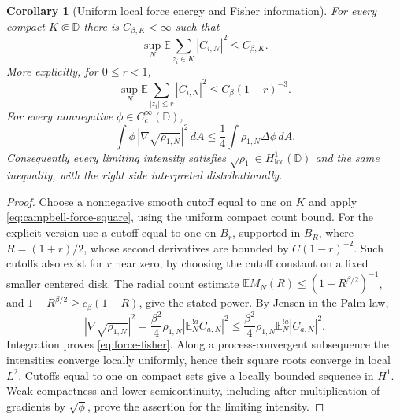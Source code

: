 \documentclass[11pt,a4paper]{article}
\numberwithin{equation}{section}
\newtheorem{corollary}[theorem]{Corollary}
\theoremstyle{definition}
\theoremstyle{remark}
\newcommand{\D}{\mathbb D}
\newcommand{\E}{\mathbb E}
\begin{document}
\begin{corollary}[Uniform local force energy and Fisher information]
\label{cor:uniform-campbell-force}
For every compact $K\Subset\D$ there is $C_{\beta,K}<\infty$ such that
\begin{equation}\label{eq:uniform-campbell-force}
 \sup_N\E\sum_{z_i\in K}|C_{i,N}|^2\le C_{\beta,K}.
\end{equation}
More explicitly, for $0\le r<1$,
\begin{equation}\label{eq:explicit-campbell-force}
 \sup_N\E\sum_{|z_i|\le r}|C_{i,N}|^2
 \le C_\beta(1-r)^{-3}.
\end{equation}
For every nonnegative $\phi\in C_c^\infty(\D)$,
\begin{equation}\label{eq:force-fisher}
 \int\phi\,|\nabla\sqrt{\rho_{1,N}}|^2\,dA
 \le\frac14\int\rho_{1,N}\Delta\phi\,dA.
\end{equation}
Consequently every limiting intensity satisfies
$\sqrt{\rho_1}\in H^1_{\mathrm{loc}}(\D)$ and the same inequality,
with the right side interpreted distributionally.
\end{corollary}

\begin{proof}
Choose a nonnegative smooth cutoff equal to one on $K$ and apply
\eqref{eq:campbell-force-square}, using the uniform compact count bound.
For the explicit version use a cutoff equal to one on $B_r$, supported
in $B_R$, where $R=(1+r)/2$, whose second derivatives are bounded by
$C(1-r)^{-2}$. Such cutoffs also exist for $r$ near zero, by choosing
the cutoff constant on a fixed smaller centered disk. The radial count
estimate $\E M_N(R)\le (1-R^{\beta/2})^{-1}$, and
$1-R^{\beta/2}\ge c_\beta(1-R)$, give the stated power.
By Jensen in the Palm law,
\[
 |\nabla\sqrt{\rho_{1,N}}|^2
 =\frac{\beta^2}4\rho_{1,N}|\E_N^{!a}C_{a,N}|^2
 \le\frac{\beta^2}4\rho_{1,N}\E_N^{!a}|C_{a,N}|^2.
\]
Integration proves \eqref{eq:force-fisher}. Along a process-convergent
subsequence the intensities converge locally uniformly, hence their
square roots converge in local $L^2$. Cutoffs equal to one on compact
sets give a locally bounded sequence in $H^1$. Weak compactness and
lower semicontinuity, including after multiplication of gradients by
$\sqrt\phi$, prove the assertion for the limiting intensity.
\end{proof}
\end{document}
